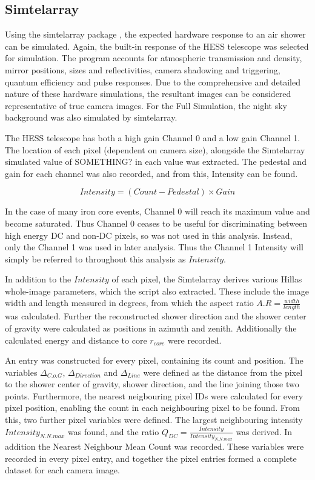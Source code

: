 \documentclass{article}
\begin{document}
\subsection{Sim\textunderscore telarray}
Using the sim\textunderscore telarray package \cite{Bernlohr08}, the expected hardware response to an air shower can be simulated. Again, the built-in response of the HESS telescope was selected for simulation. The program accounts for atmospheric transmission and density, mirror positions, sizes and reflectivities, camera shadowing and triggering, quantum efficiency and pulse responses. Due to the comprehensive and detailed nature of these hardware simulations, the resultant images can be considered representative of true camera images. For the Full Simulation, the night sky background was also simulated by sim\textunderscore telarray.

The HESS telescope has both a high gain Channel 0 and a low gain Channel 1. The location of each pixel (dependent on camera size), alongside the Sim\textunderscore telarray simulated value of SOMETHING? in each value was extracted. The pedestal and gain for each channel was also recorded, and from this, Intensity can be found.

\[ Intensity = (Count - Pedestal)\times Gain \]

In the case of many iron core events, Channel 0 will reach its maximum value and become saturated. Thus Channel 0 ceases to be useful for discriminating between high energy DC and non-DC pixels, so was not used in this analysis. Instead, only the Channel 1 was used in later analysis. Thus the Channel 1 Intensity will simply be referred to throughout this analysis as $Intensity$. 

In addition to the $Intensity$ of each pixel, the Sim\textunderscore telarray derives various Hillas whole-image parameters, which the script also extracted. These include the image width and length measured in degrees, from which the aspect ratio $A.R = \frac{width}{length}$ was calculated. Further the reconstructed shower direction and the shower center of gravity were calculated as positions in azimuth and zenith. Additionally the calculated energy and distance to core $r_{core}$ were recorded.

An entry was constructed for every pixel, containing its count and position. The variables $ \Delta_{C.o.G}$, $\Delta_{Direction}$ and $\Delta_{Line}$ were defined as the distance from the pixel to the shower center of gravity, shower direction, and the line joining those two points. Furthermore, the nearest neigbouring pixel IDs were calculated for every pixel position, enabling the count in each neighbouring pixel to be found. From this, two further pixel variables were defined. The largest neighbouring intensity $Intensity_{N.N.max}$ was found, and the ratio $ Q_{DC} = \frac{Intensity}{Intensity_{N.N.max}} $ was derived. In addition the Nearest Neighbour Mean Count was recorded. These variables were recorded in every pixel entry, and together the pixel entries formed a complete dataset for each camera image.
\end{document}
